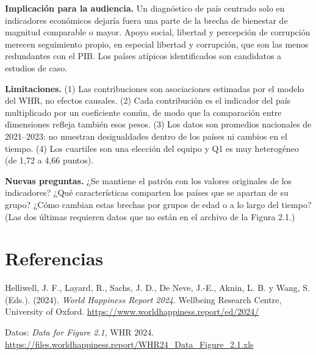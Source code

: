 \documentclass[11pt,a4paper]{article}
\begin{document}
\textbf{Implicación para la audiencia.} Un diagnóstico de país centrado solo en indicadores económicos dejaría
fuera una parte de la brecha de bienestar de magnitud comparable o mayor. Apoyo social, libertad y percepción de
corrupción merecen seguimiento propio, en especial libertad y corrupción, que son las menos redundantes con el
PIB. Los países atípicos identificados son candidatos a estudios de caso.

\textbf{Limitaciones.} (1) Las contribuciones son asociaciones estimadas por el modelo del WHR, no efectos
causales. (2) Cada contribución es el indicador del país multiplicado por un coeficiente común, de modo que la
comparación entre dimensiones refleja también esos pesos. (3) Los datos son promedios nacionales de 2021--2023:
no muestran desigualdades dentro de los países ni cambios en el tiempo. (4) Los cuartiles son una elección del
equipo y Q1 es muy heterogéneo (de 1,72 a 4,66 puntos).

\textbf{Nuevas preguntas.} ¿Se mantiene el patrón con los valores originales de los indicadores? ¿Qué
características comparten los países que se apartan de su grupo? ¿Cómo cambian estas brechas por grupos de edad
o a lo largo del tiempo? (Las dos últimas requieren datos que no están en el archivo de la Figura 2.1.)

\section*{Referencias}
\small
Helliwell, J. F., Layard, R., Sachs, J. D., De Neve, J.-E., Aknin, L. B. y Wang, S. (Eds.). (2024).
\textit{World Happiness Report 2024}. Wellbeing Research Centre, University of Oxford.
\url{https://www.worldhappiness.report/ed/2024/}

\noindent Datos: \textit{Data for Figure 2.1}, WHR 2024.
\url{https://files.worldhappiness.report/WHR24_Data_Figure_2.1.xls}
\end{document}
